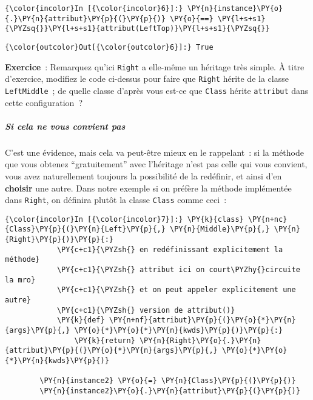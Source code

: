     \begin{Verbatim}[commandchars=\\\{\},frame=single,framerule=0.3mm,rulecolor=\color{cellframecolor}]
{\color{incolor}In [{\color{incolor}6}]:} \PY{n}{instance}\PY{o}{.}\PY{n}{attribut}\PY{p}{(}\PY{p}{)} \PY{o}{==} \PY{l+s+s1}{\PYZsq{}}\PY{l+s+s1}{attribut(LeftTop)}\PY{l+s+s1}{\PYZsq{}}
\end{Verbatim}


\begin{Verbatim}[commandchars=\\\{\},frame=single,framerule=0.3mm,rulecolor=\color{cellframecolor}]
{\color{outcolor}Out[{\color{outcolor}6}]:} True
\end{Verbatim}
            
    \textbf{Exercice}~: Remarquez qu'ici \texttt{Right} a elle-même un
héritage très simple. À titre d'exercice, modifiez le code ci-dessus
pour faire que \texttt{Right} hérite de la classe \texttt{LeftMiddle}~;
de quelle classe d'après vous est-ce que \texttt{Class} hérite
\texttt{attribut} dans cette configuration~?

    \hypertarget{si-cela-ne-vous-convient-pas}{%
\subparagraph{Si cela ne vous convient
pas}\label{si-cela-ne-vous-convient-pas}}

    C'est une évidence, mais cela va peut-être mieux en le rappelant~: si la
méthode que vous obtenez ``gratuitement'' avec l'héritage n'est pas
celle qui vous convient, vous avez naturellement toujours la possibilité
de la redéfinir, et ainsi d'en \textbf{choisir} une autre. Dans notre
exemple si on préfère la méthode implémentée dans \texttt{Right}, on
définira plutôt la classe \texttt{Class} comme ceci~:

    \begin{Verbatim}[commandchars=\\\{\},frame=single,framerule=0.3mm,rulecolor=\color{cellframecolor}]
{\color{incolor}In [{\color{incolor}7}]:} \PY{k}{class} \PY{n+nc}{Class}\PY{p}{(}\PY{n}{Left}\PY{p}{,} \PY{n}{Middle}\PY{p}{,} \PY{n}{Right}\PY{p}{)}\PY{p}{:}
            \PY{c+c1}{\PYZsh{} en redéfinissant explicitement la méthode}
            \PY{c+c1}{\PYZsh{} attribut ici on court\PYZhy{}circuite la mro}
            \PY{c+c1}{\PYZsh{} et on peut appeler explicitement une autre}
            \PY{c+c1}{\PYZsh{} version de attribut()}
            \PY{k}{def} \PY{n+nf}{attribut}\PY{p}{(}\PY{o}{*}\PY{n}{args}\PY{p}{,} \PY{o}{*}\PY{o}{*}\PY{n}{kwds}\PY{p}{)}\PY{p}{:}
                \PY{k}{return} \PY{n}{Right}\PY{o}{.}\PY{n}{attribut}\PY{p}{(}\PY{o}{*}\PY{n}{args}\PY{p}{,} \PY{o}{*}\PY{o}{*}\PY{n}{kwds}\PY{p}{)}
            
        \PY{n}{instance2} \PY{o}{=} \PY{n}{Class}\PY{p}{(}\PY{p}{)}
        \PY{n}{instance2}\PY{o}{.}\PY{n}{attribut}\PY{p}{(}\PY{p}{)}
\end{Verbatim}


